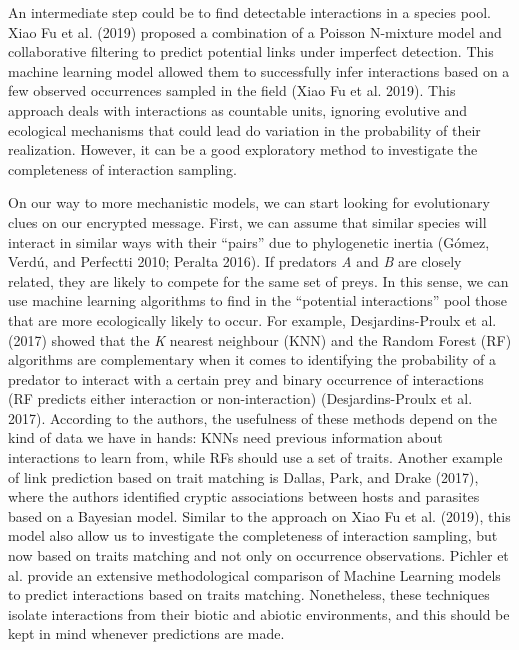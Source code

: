 \documentclass[12pt]{article}
\begin{document}
An intermediate step could be to find detectable interactions in a
species pool. Xiao Fu et al. (2019) proposed a combination of a Poisson
N-mixture model and collaborative filtering to predict potential links
under imperfect detection. This machine learning model allowed them to
successfully infer interactions based on a few observed occurrences
sampled in the field (Xiao Fu et al. 2019). This approach deals with
interactions as countable units, ignoring evolutive and ecological
mechanisms that could lead do variation in the probability of their
realization. However, it can be a good exploratory method to investigate
the completeness of interaction sampling.

On our way to more mechanistic models, we can start looking for
evolutionary clues on our encrypted message. First, we can assume that
similar species will interact in similar ways with their ``pairs'' due
to phylogenetic inertia (Gómez, Verdú, and Perfectti 2010; Peralta
2016). If predators \emph{A} and \emph{B} are closely related, they are
likely to compete for the same set of preys. In this sense, we can use
machine learning algorithms to find in the ``potential interactions''
pool those that are more ecologically likely to occur. For example,
Desjardins-Proulx et al. (2017) showed that the \emph{K} nearest
neighbour (KNN) and the Random Forest (RF) algorithms are complementary
when it comes to identifying the probability of a predator to interact
with a certain prey and binary occurrence of interactions (RF predicts
either interaction or non-interaction) (Desjardins-Proulx et al. 2017).
According to the authors, the usefulness of these methods depend on the
kind of data we have in hands: KNNs need previous information about
interactions to learn from, while RFs should use a set of traits.
Another example of link prediction based on trait matching is Dallas,
Park, and Drake (2017), where the authors identified cryptic
associations between hosts and parasites based on a Bayesian model.
Similar to the approach on Xiao Fu et al. (2019), this model also allow
us to investigate the completeness of interaction sampling, but now
based on traits matching and not only on occurrence observations.
Pichler et al. provide an extensive methodological comparison of Machine
Learning models to predict interactions based on traits matching.
Nonetheless, these techniques isolate interactions from their biotic and
abiotic environments, and this should be kept in mind whenever
predictions are made.
\end{document}
